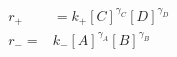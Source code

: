 \begin{eqnarray}
r_+  & =  k_+[C]^{\gamma_C}[D]^{\gamma_D} \\
r_-  = & k_-[A]^{\gamma_A}[B]^{\gamma_B} \\
\end{eqnarray}